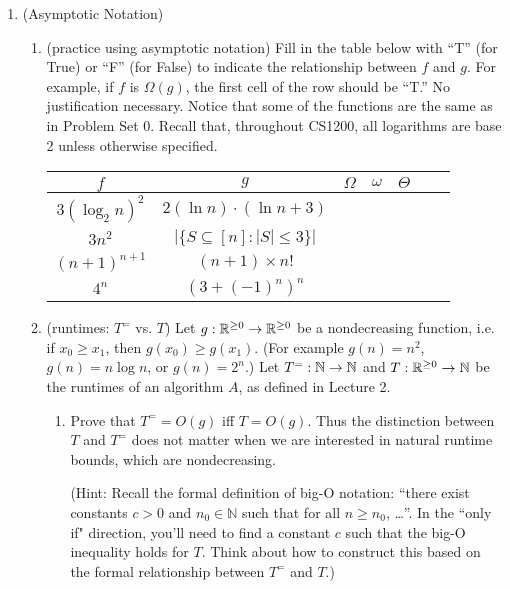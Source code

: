 \documentclass[11pt]{article}
\begin{document}
\begin{enumerate}
    \item (Asymptotic Notation) 
    \begin{enumerate}
    \item (practice using asymptotic notation)
        Fill in the table below with ``T'' (for True) or ``F'' (for False) to indicate the relationship between $f$ and $g$. For example, if $f$ is $\Omega(g)$, the first cell of the row should be ``T.''   No justification necessary.  Notice that some of the functions are the same as in Problem Set 0. Recall that, throughout CS1200, all logarithms are base 2 unless otherwise specified. 
        
        \begin{table}[h!]
        \centering
        \bgroup
        \def\arraystretch{1.3}
        \begin{tabular}{||c | c || c | c | c | c | c ||}
         \hline
         $f$ & $g$ & $\Omega$ & $\omega$ & $\Theta$ \\
         \hline\hline
         $3(\log_2 n)^2$ & $2(\ln n) \cdot (\ln n + 3)$ & & & \\ \hline
         $3n^2$ & $|\{ S \subseteq [n] : |S| \leq 3 \}|$ & & &  \\ \hline
         $(n+1)^{n+1}$ & $(n+1) \times n!$ & & & \\ \hline
         $4^n$ & $\left(3+(-1)^n\right)^n$ & & & \\ \hline
        \end{tabular}
        \egroup
        \end{table}
        
       
    
    \item  (runtimes: $T^=$ vs. $T$)  
    Let $g : \mathbb{R}^{\geq 0}\rightarrow \mathbb{R}^{\geq 0}$ be a nondecreasing function, i.e. if $x_0\geq x_1$, then $g(x_0)\geq g(x_1)$. (For example $g(n)=n^2$, $g(n)=n\log n$, or $g(n)=2^n$.) Let $T^{=} : \mathbb{N}\rightarrow \mathbb{N}$ and $T : \mathbb{R}^{\geq 0}\rightarrow \mathbb{N}$ be the runtimes of an algorithm $A$, as defined in Lecture 2. 
    \begin{enumerate}   
    \item Prove that $T^{=}=O(g)$ iff $T=O(g)$. Thus the distinction between $T$ and $T^{=}$ does not matter when we are interested in natural runtime bounds, which are nondecreasing.

    (Hint: Recall the formal definition of big-O notation: 
``there exist constants $c > 0$ and $n_0 \in \mathbb{N}$ such that for all 
$n \geq n_0$, \ldots''. In the ``only if" direction, you'll need to find a constant $c$ such that the big-O inequality holds for $T$. Think about how to construct this based on the formal relationship between $T^=$ and $T$.)





\end{enumerate}
\end{enumerate}
\end{enumerate}
\end{document}
